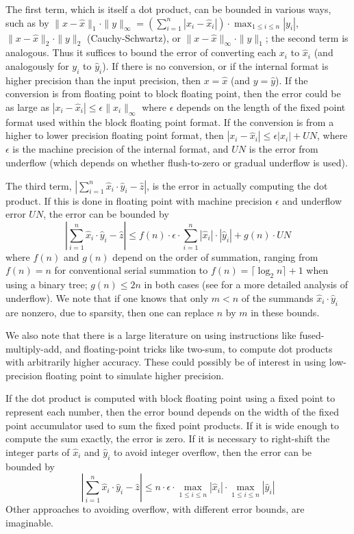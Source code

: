 \documentclass{article}
\begin{document}
The first term, which is itself a dot product, can be
bounded in various ways, such as by 
$\|x - \hat{x}\|_{1} \cdot \|y\|_{\infty} = (\sum_{i=1}^n |x_i - \hat{x}_i |) \cdot \max_{1 \leq i \leq n} |y_i|$,
$\|x - \hat{x}\|_{2} \cdot \|y\|_{2}$ (Cauchy-Schwartz), or
$\|x - \hat{x}\|_{\infty} \cdot \|y\|_{1}$; the second
term is analogous. Thus it suffices to bound the error of
converting each $x_i$ to $\hat{x}_i$ (and analogously for $y_i$ to
$\hat{y}_i$). If there is no conversion, or if the internal format
is higher precision than the input precision, then $x=\hat{x}$
(and $y=\hat{y}$). If the conversion is from floating point to
block floating point, then the error could be as large as
$| x_i - \hat{x}_i | \leq \epsilon \| x_i \|_{\infty}$ where
$\epsilon$ depends on the length of the fixed point format used
within the block floating point format. If the conversion is
from a higher to lower precision floating point format, then
$| x_i - \hat{x}_i | \leq \epsilon | x_i | + UN$, where
$\epsilon$ is the machine precision of the internal format,
and $UN$ is the error from underflow (which depends on whether
flush-to-zero or gradual underflow is used).

The third term, $|\sum_{i=1}^n \hat{x}_i \cdot \hat{y}_i - \hat{z} |$,
is the error in actually computing the dot product.
If this is done in floating point with machine precision $\epsilon$
and underflow error $UN$, the error can be bounded by
\[
|\sum_{i=1}^n \hat{x}_i \cdot \hat{y}_i - \hat{z} | \leq
f(n) \cdot \epsilon \cdot \sum_{i=1}^n |\hat{x}_i| \cdot |\hat{y}_i| + g(n) \cdot UN
\]
where $f(n)$ and $g(n)$ depend on the order of summation, ranging
from $f(n)=n$ for conventional serial summation to 
$f(n) = \lceil \log_2 n \rceil + 1$ when using a binary tree;
$g(n) \leq 2n$ in both cases (see \cite{Demmel84} for a more detailed
analysis of underflow). We note that if one knows that only $m < n$ of 
the summands $\hat{x}_i \cdot \hat{y}_i$ are nonzero, due to sparsity,
then one can replace $n$ by $m$ in these bounds.

We also note that there is a large literature
on using instructions like fused-multiply-add, and floating-point
tricks like two-sum, to compute dot products with arbitrarily higher
accuracy. These could possibly be of interest in using low-precision
floating point to simulate higher precision.

If the dot product is computed with block floating point using
a fixed point to represent each number, then the error bound depends
on the width of the fixed point accumulator used to sum the
fixed point products. If it is wide enough to compute the sum exactly,
the error is zero. If it is necessary to right-shift the integer
parts of $\hat{x}_i$ and $\hat{y}_i$ to avoid integer overflow, 
then the error can be bounded by
\[
|\sum_{i=1}^n \hat{x}_i \cdot \hat{y}_i - \hat{z} | \leq
n \cdot \epsilon \cdot \max_{1 \leq i \leq n} |\hat{x}_i| \cdot \max_{1 \leq i \leq n} |\hat{y}_i| 
\]
Other approaches to avoiding overflow, with different error bounds,
are imaginable. 
\end{document}
